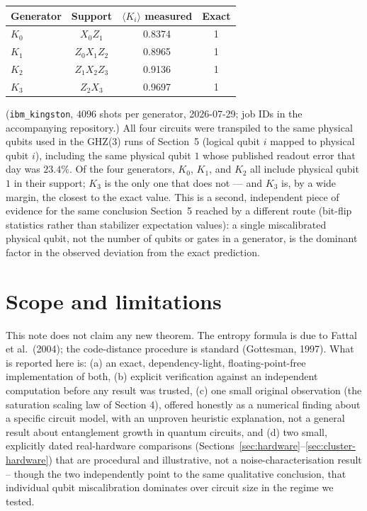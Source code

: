 \documentclass[11pt]{article}
\begin{document}
\begin{center}
\begin{tabular}{lccc}
Generator & Support & $\langle K_i\rangle$ measured & Exact \\
\hline
$K_0$ & $X_0 Z_1$ & 0.8374 & 1 \\
$K_1$ & $Z_0 X_1 Z_2$ & 0.8965 & 1 \\
$K_2$ & $Z_1 X_2 Z_3$ & 0.9136 & 1 \\
$K_3$ & $Z_2 X_3$ & 0.9697 & 1 \\
\end{tabular}
\end{center}

(\texttt{ibm\_kingston}, $4096$ shots per generator, 2026-07-29; job IDs
in the accompanying repository.) All four circuits were transpiled to the
same physical qubits used in the GHZ(3) runs of Section~5 (logical qubit
$i$ mapped to physical qubit $i$), including the same physical qubit $1$
whose published readout error that day was $23.4\%$. Of the four
generators, $K_0$, $K_1$, and $K_2$ all include physical qubit $1$ in
their support; $K_3$ is the only one that does not --- and $K_3$ is, by a
wide margin, the closest to the exact value. This is a second,
independent piece of evidence for the same conclusion Section~5 reached
by a different route (bit-flip statistics rather than stabilizer
expectation values): a single miscalibrated physical qubit, not the
number of qubits or gates in a generator, is the dominant factor in the
observed deviation from the exact prediction.

\section{Scope and limitations}

This note does not claim any new theorem. The entropy formula is due to
Fattal et al.\ (2004); the code-distance procedure is standard
(Gottesman, 1997). What is reported here is: (a) an exact,
dependency-light, floating-point-free implementation of both, (b)
explicit verification against an independent computation before any
result was trusted, (c) one small original observation (the
saturation scaling law of Section 4), offered honestly as a numerical
finding about a specific circuit model, with an unproven heuristic
explanation, not a general result about entanglement growth in quantum
circuits, and (d) two small, explicitly dated real-hardware comparisons
(Sections~\ref{sec:hardware}--\ref{sec:cluster-hardware}) that are
procedural and illustrative, not a noise-characterisation result --
though the two independently point to the same qualitative conclusion,
that individual qubit miscalibration dominates over circuit size in the
regime we tested.
\end{document}
